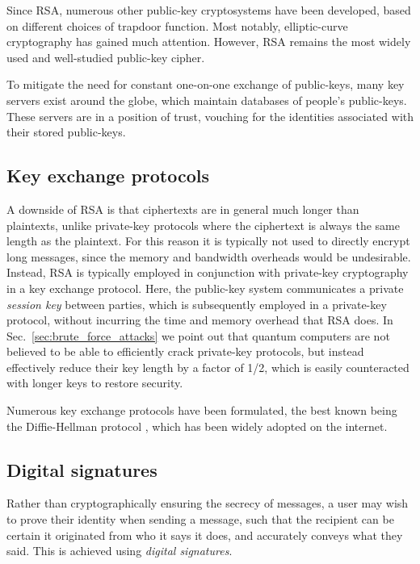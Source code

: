 Since RSA, numerous other public-key cryptosystems have been developed, based on different choices of trapdoor function. Most notably, elliptic-curve cryptography has gained much attention. However, RSA remains the most widely used and well-studied public-key cipher.

To mitigate the need for constant one-on-one exchange of public-keys, many key servers exist around the globe, which maintain databases of people's public-keys. These servers are in a position of trust, vouching for the identities associated with their stored public-keys.

%
%

\subsection{Key exchange protocols}

A downside of RSA is that ciphertexts are in general much longer than plaintexts, unlike private-key protocols where the ciphertext is always the same length as the plaintext. For this reason it is typically not used to directly encrypt long messages, since the memory and bandwidth overheads would be undesirable. Instead, RSA is typically employed in conjunction with private-key cryptography in a key exchange protocol. Here, the public-key system communicates a private \textit{session key} between parties, which is subsequently employed in a private-key protocol, without incurring the time and memory overhead that RSA does. In Sec.~\ref{sec:brute_force_attacks} we point out that quantum computers are not believed to be able to efficiently crack private-key protocols, but instead effectively reduce their key length by a factor of 1/2, which is easily counteracted with longer keys to restore security.

Numerous key exchange protocols have been formulated, the best known being the Diffie-Hellman protocol \cite{bib:DiffieHellman}, which has been widely adopted on the internet.

%
%

\subsection{Digital signatures} \label{sec:dig_sig} 

Rather than cryptographically ensuring the secrecy of messages, a user may wish to prove their identity when sending a message, such that the recipient can be certain it originated from who it says it does, and accurately conveys what they said. This is achieved using \textit{digital signatures}.

